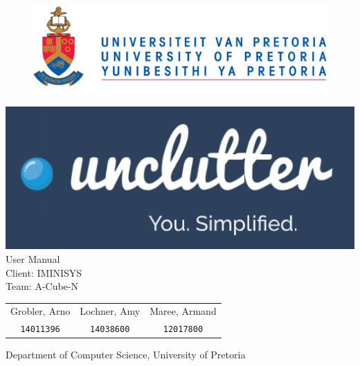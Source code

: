 \documentclass[hidelinks,english]{article}
\date{\today}
\begin{document}
    \begin{titlepage}
        \begin{figure}[!t]
            \includegraphics[width=\linewidth]{up_logo.png}
        \end{figure}
        \begin{center}
            \includegraphics[width=\linewidth]{coverpage.PNG}\\
            \huge{User Manual\\}
            \large{Client: IMINISYS}\\
            \vspace{10mm}
            \huge{Team: A-Cube-N}\\
        \end{center}
        \begin{center}
            \begin{tabular}{ c c c }
                Grobler, Arno & Lochner, Amy & Maree, Armand \\
                \texttt{14011396} & \texttt{14038600}& \texttt{12017800} \\             
            \end{tabular}
        \end{center}
        \begin{center}
            Department of Computer Science, University of Pretoria
        \end{center}
    \end{titlepage}
    \newpage
    \tableofcontents
    \newpage
    
\end{document}
